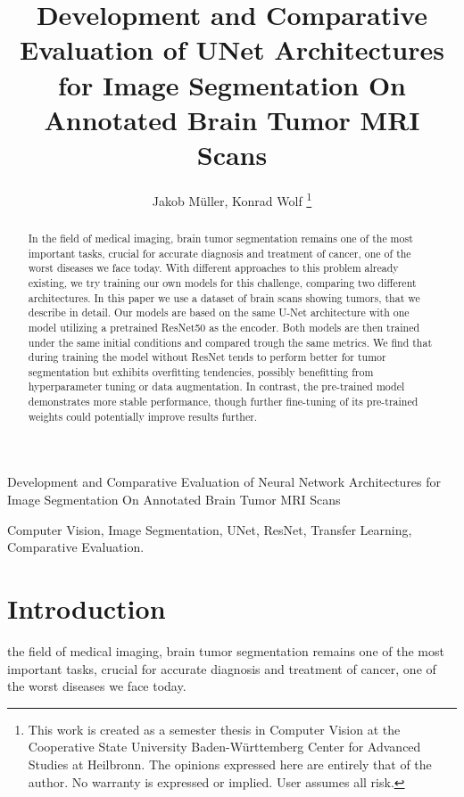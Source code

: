 \documentclass[lettersize,journal]{IEEEtran}
\begin{document}
\title{Development and Comparative Evaluation of UNet Architectures for Image Segmentation On Annotated Brain Tumor MRI Scans}

\author{Jakob Müller, Konrad Wolf
\thanks{This work is created as a semester thesis in Computer Vision at the Cooperative State University Baden-Württemberg Center for Advanced Studies at Heilbronn. The opinions expressed here are entirely that of the author. No warranty is expressed or implied. User assumes all risk.}}
%
{Development and Comparative Evaluation of Neural Network Architectures for Image Segmentation On Annotated Brain Tumor MRI Scans}



\maketitle



\begin{abstract}
  In the field of medical imaging, brain tumor segmentation remains one of the most important tasks, crucial for accurate diagnosis and treatment of cancer, one of the worst diseases we face today. With different approaches to this problem already existing, we try training our own models for this challenge, comparing two different architectures. In this paper we use a dataset of brain scans showing tumors, that we describe in detail. Our models are based on the same U-Net architecture with one model utilizing a pretrained ResNet50 as the encoder. Both models are then trained under the same initial conditions and compared trough the same metrics. We find that during training the model without ResNet tends to perform better for tumor segmentation but exhibits overfitting tendencies, possibly benefitting from hyperparameter tuning or data augmentation. In contrast, the pre-trained model demonstrates more stable performance, though further fine-tuning of its pre-trained weights could potentially improve results further.
\end{abstract}



\begin{IEEEkeywords}
Computer Vision, Image Segmentation, UNet, ResNet, Transfer Learning, Comparative Evaluation.
\end{IEEEkeywords}


\section{Introduction}
 the field of medical imaging, brain tumor segmentation remains one of the most important tasks, crucial for accurate diagnosis and treatment of cancer, one of the worst diseases we face today. 
\end{document}

